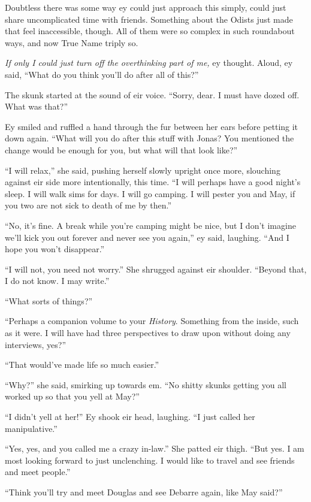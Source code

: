 Doubtless there was some way ey could just approach this simply, could just share uncomplicated time with friends. Something about the Odists just made that feel inaccessible, though. All of them were so complex in such roundabout ways, and now True Name triply so.

\emph{If only I could just turn off the overthinking part of me,} ey thought. Aloud, ey said, ``What do you think you'll do after all of this?''

The skunk started at the sound of eir voice. ``Sorry, dear. I must have dozed off. What was that?''

Ey smiled and ruffled a hand through the fur between her ears before petting it down again. ``What will you do after this stuff with Jonas? You mentioned the change would be enough for you, but what will that look like?''

``I will relax,'' she said, pushing herself slowly upright once more, slouching against eir side more intentionally, this time. ``I will perhaps have a good night's sleep. I will walk sims for days. I will go camping. I will pester you and May, if you two are not sick to death of me by then.''

``No, it's fine. A break while you're camping might be nice, but I don't imagine we'll kick you out forever and never see you again,'' ey said, laughing. ``And I hope you won't disappear.''

``I will not, you need not worry.'' She shrugged against eir shoulder. ``Beyond that, I do not know. I may write.''

``What sorts of things?''

``Perhaps a companion volume to your \emph{History}. Something from the inside, such as it were. I will have had three perspectives to draw upon without doing any interviews, yes?''

``That would've made life so much easier.''

``Why?'' she said, smirking up towards em. ``No shitty skunks getting you all worked up so that you yell at May?''

``I didn't yell at her!'' Ey shook eir head, laughing. ``I just called her manipulative.''

``Yes, yes, and you called me a crazy in-law.'' She patted eir thigh. ``But yes. I am most looking forward to just unclenching. I would like to travel and see friends and meet people.''

``Think you'll try and meet Douglas and see Debarre again, like May said?''

